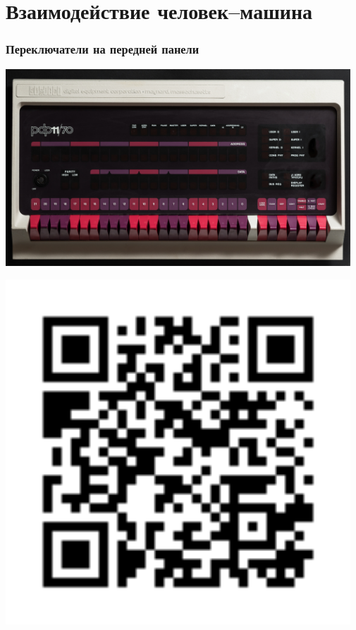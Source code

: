 \documentclass[t,aspectratio=169]{beamer}
\begin{document}
\section{Взаимодействие человек--машина}
\begin{frame}
    \frametitle{Переключатели на передней панели}
    \begin{minipage}{0.8\textwidth}
        \begin{centering}
            \includegraphics[width=0.97\textwidth]{pdp1170-fp}
        \end{centering}
    \end{minipage}
    \begin{minipage}{0.19\textwidth}
            \includegraphics[width=0.97\textwidth]{js-pdp11}
    \end{minipage}
\end{frame}
\end{document}
